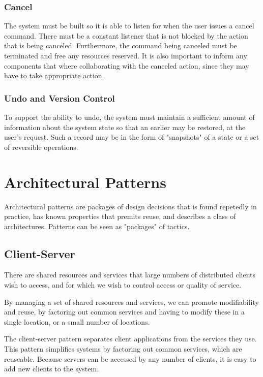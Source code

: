 \documentclass{report}
\begin{document}
\subsubsection{Cancel}
The system must be built so it is able to listen for when the user issues a cancel command. There must be a constant listener that is not blocked by the action that is being canceled. Furthermore, the command being canceled must be terminated and free any resources reserved.  It is also important to inform any components that where collaborating with the canceled action, since they may have to take appropriate action. \cite[p. 179]{book:bass}

\subsubsection{Undo and Version Control}
To support the ability to undo, the system must maintain a sufficient amount of information about the system state so that an earlier may be restored, at the user's request. Such a record may be in the form of "snapshots" of a state or a set of reversible operations. \cite[p. 179]{book:bass}

\newpage
\section{Architectural Patterns} \label{sec:architectural_patterns}
Architectural patterns are packages of design decisions that is found repetedly in practice, has known properties that premits reuse, and describes a class of architectures. Patterns can be seen as "packages" of tactics. \cite[p. 204]{book:bass}

\subsection{Client-Server}
There are shared resources and services that large numbers of distributed clients wish to access, and for which we wish to control access or quality of service.

By managing a set of shared resources and services, we can promote modifiability and reuse, by factoring out common services and having to modify these in a single location, or a small number of locations.

The client-server pattern separates client applications from the services they use. This pattern simplifies systems by factoring out common services, which are reuseable. Because servers can be accessed by any number of clients, it is easy to add new clients to the system.
\end{document}
